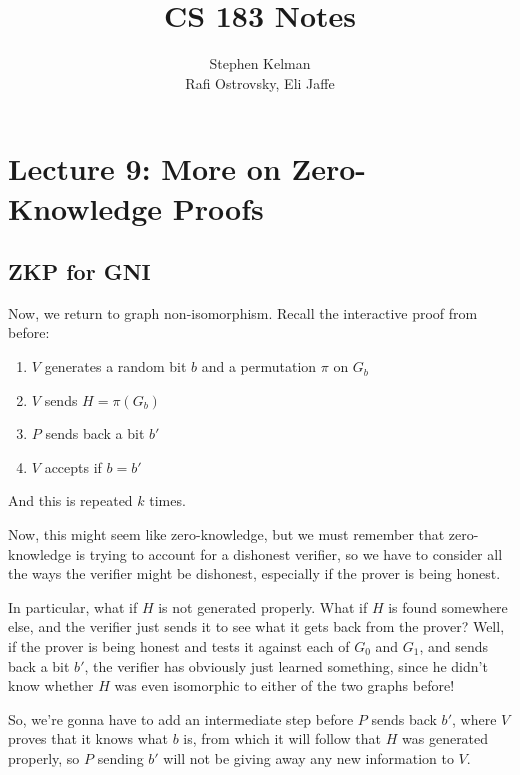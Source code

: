 \documentclass[11pt]{article}
\title{CS 183 Notes}
\author{Stephen Kelman\\ Rafi Ostrovsky, Eli Jaffe}
\begin{document}
\section{Lecture 9: More on Zero-Knowledge Proofs}

\subsection{ZKP for GNI}

Now, we return to graph non-isomorphism. Recall the interactive proof from before:
\begin{enumerate}
\item \(V\) generates a random bit \(b\) and a permutation \(\pi\) on \(G_b\)
\item \(V\) sends \(H=\pi(G_b)\)
\item \(P\) sends back a bit \(b'\)
\item \(V\) accepts if \(b=b'\)
\end{enumerate}
And this is repeated \(k\) times. \bigskip

Now, this might seem like zero-knowledge, but we must remember that zero-knowledge is trying to account for a dishonest verifier, so we have to consider all the ways the verifier might be dishonest, especially if the prover is being honest.\medskip

In particular, what if \(H\) is not generated properly. What if \(H\) is found somewhere else, and the verifier just sends it to see what it gets back from the prover? Well, if the prover is being honest and tests it against each of \(G_0\) and \(G_1\), and sends back a bit \(b'\), the verifier has obviously just learned something, since he didn't know whether \(H\) was even isomorphic to either of the two graphs before!\medskip

So, we're gonna have to add an intermediate step before \(P\) sends back \(b'\), where \(V\) proves that it knows what \(b\) is, from which it will follow that \(H\) was generated properly, so \(P\) sending \(b'\) will not be giving away any new information to \(V\).
\end{document}
